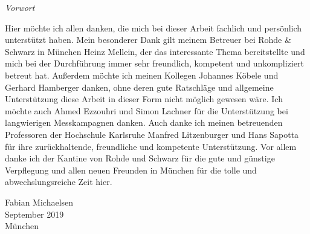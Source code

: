 

\newpage
\thispagestyle{empty}
\begin{center}
\Huge\emph{Vorwort}
\end{center}
\medskip
\noindent

Hier möchte ich allen danken, die mich bei dieser Arbeit fachlich und persönlich unterstützt haben. Mein besonderer Dank gilt meinem Betreuer bei Rohde \& Schwarz in München Heinz Mellein, der das interessante Thema bereitstellte und mich bei der Durchführung immer sehr freundlich, kompetent und unkompliziert betreut hat. Außerdem möchte ich meinen Kollegen Johannes Köbele und Gerhard Hamberger danken, ohne deren gute Ratschläge und allgemeine Unterstützung diese Arbeit in dieser Form nicht möglich gewesen wäre. Ich möchte auch Ahmed Ezzouhri und Simon Lachner für die Unterstützung bei langwierigen Messkampagnen danken. Auch danke ich meinen betreuenden Professoren der Hochschule Karlsruhe Manfred Litzenburger und Hans Sapotta für ihre zurückhaltende, freundliche und kompetente Unterstützung. Vor allem danke ich der Kantine von Rohde und Schwarz für die gute und günstige Verpflegung und allen neuen Freunden in München für die tolle und abwechslungsreiche Zeit hier.

\begin{flushright}
Fabian Michaelsen\\
September 2019\\
München
\end{flushright}

